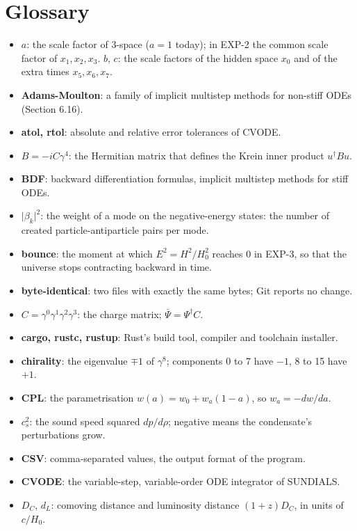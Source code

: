\documentclass[11pt]{article}
\begin{document}
\section{Glossary}

\begin{itemize}
\item \textbf{$a$}: the scale factor of 3-space ($a=1$ today); in EXP-2 the common scale factor of $x_1,x_2,x_3$. \textbf{$b$}, \textbf{$c$}: the scale factors of the hidden space $x_0$ and of the extra times $x_5,x_6,x_7$.
\item \textbf{Adams-Moulton}: a family of implicit multistep methods for non-stiff ODEs (Section 6.16).
\item \textbf{atol, rtol}: absolute and relative error tolerances of CVODE.
\item \textbf{$B=-iC\gamma^4$}: the Hermitian matrix that defines the Krein inner product $u^\dagger Bu$.
\item \textbf{BDF}: backward differentiation formulas, implicit multistep methods for stiff ODEs.
\item \textbf{$\lvert\beta_k\rvert^2$}: the weight of a mode on the negative-energy states: the number of created particle-antiparticle pairs per mode.
\item \textbf{bounce}: the moment at which $E^2=H^2/H_0^2$ reaches 0 in EXP-3, so that the universe stops contracting backward in time.
\item \textbf{byte-identical}: two files with exactly the same bytes; Git reports no change.
\item \textbf{$C=\gamma^0\gamma^1\gamma^2\gamma^3$}: the charge matrix; $\bar\Psi=\Psi^\dagger C$.
\item \textbf{cargo, rustc, rustup}: Rust's build tool, compiler and toolchain installer.
\item \textbf{chirality}: the eigenvalue $\mp1$ of $\gamma^8$; components 0 to 7 have $-1$, 8 to 15 have $+1$.
\item \textbf{CPL}: the parametrisation $w(a)=w_0+w_a(1-a)$, so $w_a=-dw/da$.
\item \textbf{$c_s^2$}: the sound speed squared $dp/d\rho$; negative means the condensate's perturbations grow.
\item \textbf{CSV}: comma-separated values, the output format of the program.
\item \textbf{CVODE}: the variable-step, variable-order ODE integrator of SUNDIALS.
\item \textbf{$D_C$}, \textbf{$d_L$}: comoving distance and luminosity distance $(1+z)D_C$, in units of $c/H_0$.

\end{itemize}
\end{document}
